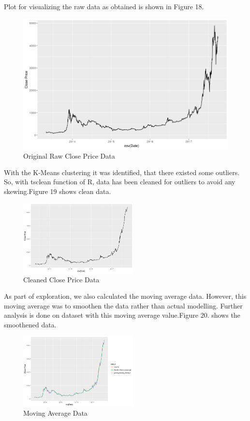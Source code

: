 \documentclass{article}
\begin{document}
Plot for visualizing the raw data as obtained is shown in Figure 18.
\begin{figure}[ht]
	\centering
	\includegraphics[scale=0.30]{RawClosePricePlot.png}
	\caption{Original Raw Close Price Data}
	\label{fig:Original Raw Close Price Data}
\end{figure}

With the K-Means clustering it was identified, that there existed some outliers.
So, with tsclean function of R, data has been cleaned for outliers to avoid any skewing.\linebreak Figure 19 shows clean data.

\begin{figure}[ht]
	\centering
	\includegraphics[width = 6cm]{CleanedClosePricePlot.png}
	\caption{Cleaned Close Price Data}
	\label{fig:Cleaned Close Price Data}
\end{figure}


As part of exploration, we also calculated the moving average data. However, this moving average was to smoothen the data rather than actual modelling.
Further analysis is done on dataset with this moving average value.\linebreak Figure 20. shows the smoothened data.

\begin{figure}[ht]
	\centering
	\includegraphics[width = 6cm]{MovingWeeklyAverage.png}
	\caption{Moving Average Data}
	\label{fig:Moving Average Data}
\end{figure}
\newpage
\end{document}
